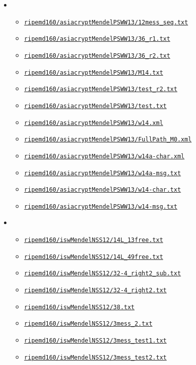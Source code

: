 \documentclass[11pt, a4paper]{article}
\newcommand{\hashlink}[2][black]{\href{https://extgit.iaik.tugraz.at/krypto/nldtool/blob/master/hash/#2}{\color{#1}\nolinkurl{#2}}}
\begin{document}
\begin{itemize}
  \item {}
    \begin{itemize}
      \item \hashlink[todo]{ripemd160/asiacryptMendelPSWW13/12mess_seq.txt}
      \item \hashlink[todo]{ripemd160/asiacryptMendelPSWW13/36_r1.txt}
      \item \hashlink[todo]{ripemd160/asiacryptMendelPSWW13/36_r2.txt}
      \item \hashlink[todo]{ripemd160/asiacryptMendelPSWW13/M14.txt}
      \item \hashlink[todo]{ripemd160/asiacryptMendelPSWW13/test_r2.txt}
      \item \hashlink[todo]{ripemd160/asiacryptMendelPSWW13/test.txt}
      \item \hashlink[todo]{ripemd160/asiacryptMendelPSWW13/w14.xml}
      \item \hashlink[todo]{ripemd160/asiacryptMendelPSWW13/FullPath_M0.xml}
      \item \hashlink[todo]{ripemd160/asiacryptMendelPSWW13/w14a-char.xml}
      \item \hashlink[todo]{ripemd160/asiacryptMendelPSWW13/w14a-msg.txt}
      \item \hashlink[todo]{ripemd160/asiacryptMendelPSWW13/w14-char.txt}
      \item \hashlink[todo]{ripemd160/asiacryptMendelPSWW13/w14-msg.txt}
    \end{itemize}
  \item {}
    \begin{itemize}
      \item \hashlink[todo]{ripemd160/iswMendelNSS12/14L_13free.txt}
      \item \hashlink[todo]{ripemd160/iswMendelNSS12/14L_49free.txt}
      \item \hashlink[todo]{ripemd160/iswMendelNSS12/32-4_right2_sub.txt}
      \item \hashlink[todo]{ripemd160/iswMendelNSS12/32-4_right2.txt}
      \item \hashlink[todo]{ripemd160/iswMendelNSS12/38.txt}
      \item \hashlink[todo]{ripemd160/iswMendelNSS12/3mess_2.txt}
      \item \hashlink[todo]{ripemd160/iswMendelNSS12/3mess_test1.txt}
      \item \hashlink[todo]{ripemd160/iswMendelNSS12/3mess_test2.txt}

\end{itemize}
\end{itemize}
\end{document}
